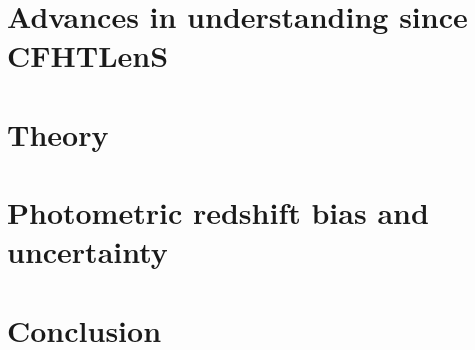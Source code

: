 \documentclass[preprint]{aastex}
\begin{document}
\section{Advances in understanding since CFHTLenS}
\label{sec:cfhtlens}


\section{Theory}
\label{sec:theory}


\section{Photometric redshift bias and uncertainty}
\label{sec:photoz}


\section{Conclusion}



\end{document}
